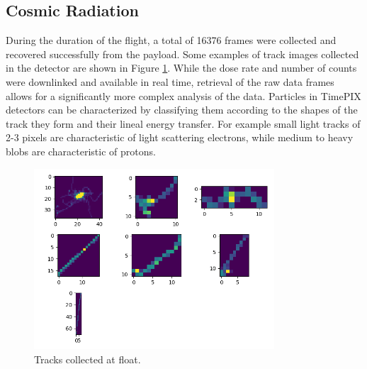 \subsection{Cosmic Radiation}
\label{sec:Cosmic-Radiation-Results}

During the duration of the flight, a total of 16376 frames were collected and recovered successfully from the payload. Some examples of track images collected in the detector are shown in Figure \ref{tracks}. While the dose rate and number of counts were downlinked and available in real time, retrieval of the raw data frames allows for a significantly more complex analysis of the data. Particles in TimePIX detectors can be characterized by classifying them according to the shapes of the track they form and their lineal energy transfer. For example small light tracks of 2-3 pixels are characteristic of light scattering electrons, while medium to heavy blobs are characteristic of protons.

\begin{figure}[h!]
	\begin{center}
	\includegraphics[width=0.8\textwidth]{figures/tracks.png}
	\caption{Tracks collected at float.}
	\label{tracks}
	\end{center}
\end{figure}

